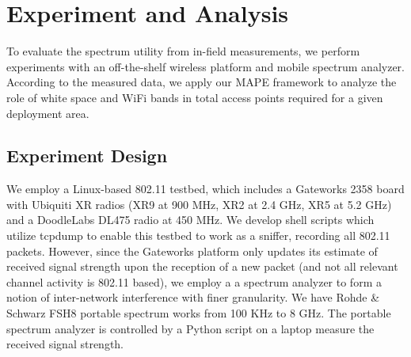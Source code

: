 \section{Experiment and Analysis}
\label{sec:experimentdesign}
To evaluate the spectrum utility from in-field measurements, we perform experiments 
with an off-the-shelf wireless platform and mobile spectrum analyzer.
According to the measured data, we apply our MAPE framework to analyze the role
of white space and WiFi bands in total access points required for a given deployment area.

\subsection{Experiment Design}
We employ a Linux-based 802.11 testbed, which includes a Gateworks 2358 board with 
Ubiquiti XR radios (XR9 at 900 MHz, XR2 at 2.4 GHz, XR5 at 5.2 GHz) and a DoodleLabs DL475 
radio at 450 MHz.  We develop shell scripts which utilize tcpdump to enable this testbed to
work as a sniffer, recording all 802.11 packets. However, since the Gateworks platform only 
updates its estimate of received signal strength upon the reception of a new packet (and
not all relevant channel activity is 802.11 based), we employ a a spectrum analyzer to form 
a notion of inter-network interference with finer granularity.  We have Rohde \& Schwarz FSH8 
portable spectrum works from 100 KHz to 8 GHz. The portable spectrum analyzer is controlled 
by a Python script on a laptop measure the received signal strength.


